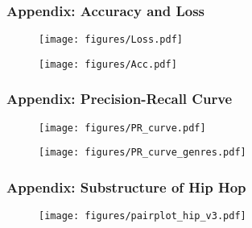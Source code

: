 \documentclass[8pt]{beamer}
\begin{document}
\appendix
\begin{frame}
    \frametitle{Appendix: Accuracy and Loss}
    \begin{figure}
        \begin{minipage}[b]{0.48\textwidth}
            \centering
            \texttt{[image: figures/Loss.pdf]}
        \end{minipage}
        \hfill
        \begin{minipage}[b]{0.48\textwidth}
            \centering
            \texttt{[image: figures/Acc.pdf]}
        \end{minipage}
    \end{figure}
\end{frame}
\begin{frame}
    \frametitle{Appendix: Precision-Recall Curve}
    \begin{figure}
        \begin{minipage}[b]{0.48\textwidth}
            \centering
            \texttt{[image: figures/PR\_curve.pdf]}
        \end{minipage}
        \hfill
        \begin{minipage}[b]{0.48\textwidth}
            \centering
            \texttt{[image: figures/PR\_curve\_genres.pdf]}
        \end{minipage}
    \end{figure}
\end{frame}
\begin{frame}
    \frametitle{Appendix: Substructure of Hip Hop}
    \begin{figure}
        \texttt{[image: figures/pairplot\_hip\_v3.pdf]}
    \end{figure}
\end{frame}
\end{document}

